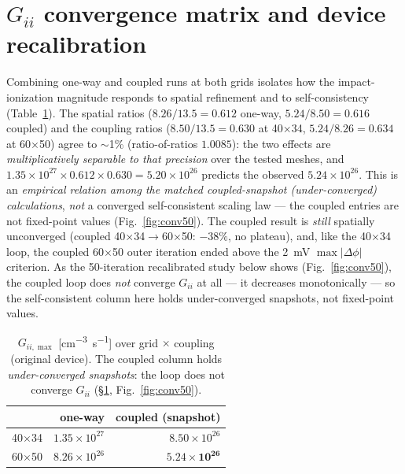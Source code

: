 \documentclass[11pt]{article}
\begin{document}
\section{$G_{ii}$ convergence matrix and device recalibration}\label{sec:giiconv}
Combining one-way and coupled runs at both grids isolates how the impact-ionization magnitude
responds to spatial refinement and to self-consistency (Table~\ref{tab:giimat}). The spatial
ratios ($8.26/13.5=0.612$ one-way, $5.24/8.50=0.616$ coupled) and the coupling ratios
($8.50/13.5=0.630$ at 40$\times$34, $5.24/8.26=0.634$ at 60$\times$50) agree to $\sim$1\%
(ratio-of-ratios $1.0085$): the two effects are \emph{multiplicatively separable to that
precision} over the tested meshes, and $1.35\times10^{27}\times0.612\times0.630=5.20\times10^{26}$
predicts the observed $5.24\times10^{26}$. This is an \emph{empirical relation among the matched
coupled-snapshot (under-converged) calculations}, \emph{not} a converged self-consistent scaling
law --- the coupled entries are not fixed-point values (Fig.~\ref{fig:conv50}). The coupled result
is \emph{still} spatially
unconverged (coupled 40$\times$34$\to$60$\times$50: $-38\%$, no plateau), and, like the
40$\times$34 loop, the coupled 60$\times$50 outer iteration ended above the \SI{2}{mV}
$\max|\Delta\phi|$ criterion. As the 50-iteration recalibrated study below shows
(Fig.~\ref{fig:conv50}), the coupled loop does \emph{not} converge $G_{ii}$ at all --- it decreases
monotonically --- so the self-consistent column here holds under-converged snapshots, not
fixed-point values.

\begin{table}[h]\centering\small
\caption{$G_{ii,\max}$ [\si{cm^{-3}s^{-1}}] over grid $\times$ coupling (original device). The
coupled column holds \emph{under-converged snapshots}: the loop does not converge $G_{ii}$
(\S\ref{sec:giiconv}, Fig.~\ref{fig:conv50}).}\label{tab:giimat}
\begin{tabular}{lrr}
\toprule
 & one-way & coupled (snapshot) \\
\midrule
40$\times$34 & $1.35\times10^{27}$ & $8.50\times10^{26}$ \\
60$\times$50 & $8.26\times10^{26}$ & $\mathbf{5.24\times10^{26}}$ \\
\bottomrule
\end{tabular}
\end{table}
\end{document}

